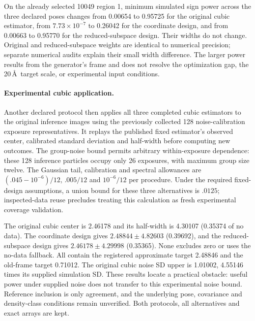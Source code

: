 On the already selected 10049 region 1, minimum simulated sign power across
the three declared poses changes from 0.00654 to 0.95725 for the original
cubic estimator, from $7.73\times10^{-7}$ to 0.26042 for the coordinate design,
and from 0.00663 to 0.95770 for the reduced-subspace design. Their widths do
not change. Original and reduced-subspace weights are identical to numerical
precision; separate numerical audits explain their small width difference.
The larger power results from the generator's frame and does not resolve the
optimization gap, the 20\,\AA\ target scale, or experimental input conditions.

\paragraph{Experimental cubic application.}
Another declared protocol then applies all three completed cubic estimators
to the original inference images using the previously collected 128
noise-calibration exposure representatives. It replays the published fixed
estimator's observed center, calibrated standard deviation and half-width
before computing new outcomes. The group-noise bound permits arbitrary
within-exposure dependence: these 128 inference particles occupy only 26
exposures, with maximum group size twelve. The Gaussian tail, calibration
and spectral allowances are $(.045-10^{-6})/12$, $.005/12$ and $10^{-6}/12$ per
procedure. Under the required fixed-design assumptions, a union bound for
these three alternatives is $.0125$; inspected-data reuse precludes treating
this calculation as fresh experimental coverage validation.

The original cubic center is 2.46178 and its half-width is 4.30107 (0.35374
of no data). The coordinate design gives $2.48844\pm4.82603$ (0.39692), and
the reduced-subspace design gives $2.46178\pm4.29998$ (0.35365). None excludes
zero or uses the no-data fallback. All contain the registered approximate
target 2.48846 and the old-frame target 0.71012. The original cubic noise SD
upper is 1.01002, 4.55146 times its supplied simulation SD. These results
locate a practical obstacle: useful power under supplied noise does not
transfer to this experimental noise bound. Reference inclusion is only
agreement, and the underlying pose, covariance and density-class conditions
remain unverified. Both protocols, all alternatives and exact arrays are kept.

